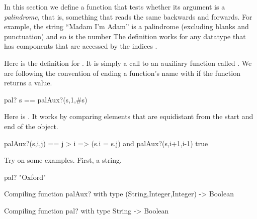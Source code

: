 In this section we define a function  that tests whether its
argument is a {\it palindrome}, that is, something that reads the same
backwards and forwards.
For example, the string ``Madam I'm Adam'' is a palindrome (excluding blanks
and punctuation) and so is the number 
The definition works for any datatype that has  components that
are accessed by the indices .

\begin{xtc}
\begin{xtccomment}
Here is the definition for .
It is simply a call to an auxiliary function called
.
We are following the convention of ending a function's name with
 if the function returns a  value.
\end{xtccomment}
\begin{spadsrc}
pal? s ==  palAux?(s,1,#s) 
\end{spadsrc}
\end{xtc}
\begin{xtc}
\begin{xtccomment}
Here is .
It works by comparing elements that are equidistant from the start and end
of the object.
\end{xtccomment}
\begin{spadsrc}
palAux?(s,i,j) ==
  j > i =>
    (s.i = s.j) and palAux?(s,i+1,i-1)
  true
\end{spadsrc}
\end{xtc}
\begin{xtc}
\begin{xtccomment}
Try  on some examples.
First, a string.
\end{xtccomment}
\begin{spadsrc}
pal? "Oxford"  
\end{spadsrc}
\begin{MessageOutput}
   Compiling function palAux? with type (String,Integer,Integer) -> 
      Boolean 
\end{MessageOutput}
\begin{MessageOutput}
   Compiling function pal? with type String -> Boolean 
\end{MessageOutput}
\begin{TeXOutput}
\begin{fricasmath}{3}
%
\end{fricasmath}
\end{TeXOutput}
\end{xtc}
